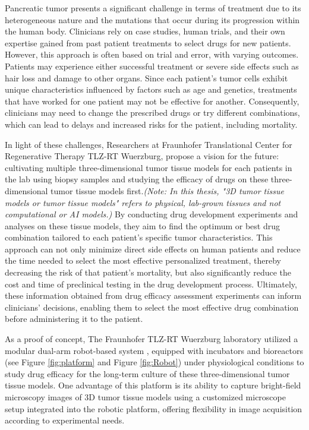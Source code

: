 \documentclass[12pt,twoside,a4paper,parskip]{scrbook} %
\begin{document}
Pancreatic tumor presents a significant challenge in terms of treatment due to its heterogeneous nature and the mutations that occur during its progression within the human body. Clinicians rely on case studies, human trials, and their own expertise gained from past patient treatments to select drugs for new patients. However, this approach is often based on trial and error, with varying outcomes. Patients may experience either successful treatment or severe side effects such as hair loss and damage to other organs. Since each patient's tumor cells exhibit unique characteristics influenced by factors such as age and genetics, treatments that have worked for one patient may not be effective for another. Consequently, clinicians may need to change the prescribed drugs or try different combinations, which can lead to delays and increased risks for the patient, including mortality.

In light of these challenges, Researchers at Fraunhofer Translational Center for Regenerative Therapy TLZ-RT Wuerzburg,  propose a vision for the future: cultivating multiple three-dimensional tumor tissue models for each patients in the lab using biopsy samples and studying the efficacy of drugs on these three-dimensional tumor tissue models first.\textit{(Note: In this thesis, "3D tumor tissue models or tumor tissue models" refers to physical, lab-grown tissues and not computational or AI models.)} By conducting drug development experiments and analyses on these tissue models, they aim to find the optimum or best drug combination tailored to each patient's specific tumor characteristics. This approach can not only minimize direct side effects on human patients and reduce the time needed to select the most effective personalized treatment, thereby decreasing the risk of that patient's mortality, but also significantly reduce the cost and time of preclinical testing in the drug development process. Ultimately, these information obtained from drug efficacy assessment experiments can inform clinicians' decisions, enabling them to select the most effective drug combination before administering it to the patient.

As a proof of concept, The Fraunhofer TLZ-RT Wuerzburg laboratory utilized a modular dual-arm robot-based system \cite{Dembski2023Establishing}, equipped with incubators and bioreactors (see Figure \ref{fig:platform} and Figure \ref{fig:Robot}) under physiological conditions to study drug efficacy for the long-term culture of these three-dimensional tumor tissue models. One advantage of this platform is its ability to capture bright-field microscopy images of 3D tumor tissue models using a customized microscope setup integrated into the robotic platform, offering flexibility in image acquisition according to experimental needs.
\end{document}
